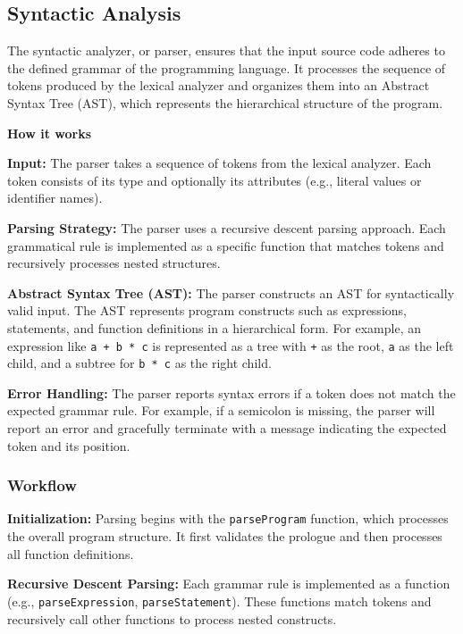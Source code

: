\documentclass[a4paper, 11pt]{article}
\begin{document}
	\subsection{Syntactic Analysis}

        The syntactic analyzer, or parser, ensures that the input source code adheres to the defined grammar of the programming language. It processes the sequence of tokens produced by the lexical analyzer and organizes them into an Abstract Syntax Tree (AST), which represents the hierarchical structure of the program.
        
        \textbf{How it works}
        
        \textbf{Input:}  
        The parser takes a sequence of tokens from the lexical analyzer. Each token consists of its type and optionally its attributes (e.g., literal values or identifier names).
        
        \textbf{Parsing Strategy:}  
        The parser uses a recursive descent parsing approach. Each grammatical rule is implemented as a specific function that matches tokens and recursively processes nested structures.
        
        \textbf{Abstract Syntax Tree (AST):}  
        The parser constructs an AST for syntactically valid input. The AST represents program constructs such as expressions, statements, and function definitions in a hierarchical form. For example, an expression like \texttt{a + b * c} is represented as a tree with \texttt{+} as the root, \texttt{a} as the left child, and a subtree for \texttt{b * c} as the right child.
        
        \textbf{Error Handling:}  
        The parser reports syntax errors if a token does not match the expected grammar rule. For example, if a semicolon is missing, the parser will report an error and gracefully terminate with a message indicating the expected token and its position.
        
        \subsubsection*{Workflow}
        
        \textbf{Initialization:}  
        Parsing begins with the \texttt{parseProgram} function, which processes the overall program structure. It first validates the prologue and then processes all function definitions.
        
        \textbf{Recursive Descent Parsing:}  
        Each grammar rule is implemented as a function (e.g., \texttt{parseExpression}, \texttt{parseStatement}). These functions match tokens and recursively call other functions to process nested constructs.
        
\end{document}
